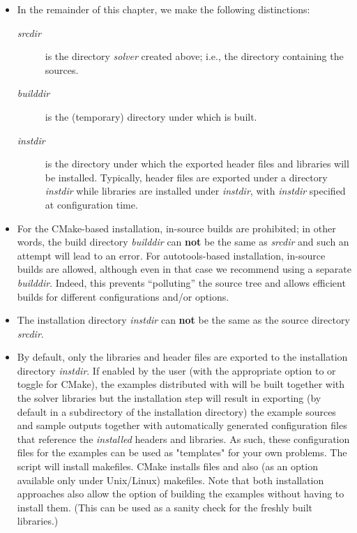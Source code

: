 \begin{itemize}

\item In the remainder of this chapter, we make the following distinctions:
  \begin{description}
  \item[{\em srcdir}] 
    is the directory {\em solver} created above; i.e., the 
    directory containing the {\sundials} sources.
  \item[{\em builddir}]
    is the (temporary) directory under which {\sundials} is built.
  \item[{\em instdir}]
    is the directory under which the {\sundials} exported header files
    and libraries will be installed. Typically, header files are exported under a directory
    {\em instdir} while libraries are installed under {\em instdir},
    with {\em instdir} specified at configuration time.
  \end{description}

\item For the CMake-based installation, in-source builds are prohibited; in other words, the
  build directory {\em builddir} can {\bf not} be the same as {\em srcdir}
  and such an attempt will lead to an error.  For autotools-based
  installation, in-source builds are allowed, although even in that
  case we recommend using a separate {\em builddir}. Indeed, this
  prevents ``polluting'' the source tree and allows efficient builds
  for different configurations and/or options.

\item {\warn} The installation directory {\em instdir} can {\bf not} be the same as
  the source directory {\em srcdir}.

\item By default, only the libraries and header files are exported to the installation
  directory {\em instdir}.  If enabled by the user (with the
  appropriate option to  or toggle for CMake), the
  examples distributed with {\sundials} will be built together with
  the solver libraries but the installation step will result in
  exporting (by default in a subdirectory of the installation
  directory) the example sources and sample outputs together with
  automatically generated configuration files that reference the {\em
  installed} {\sundials} headers and libraries.  As such, these
  configuration files for the {\sundials} examples can be used as
  "templates" for your own problems. The  script will
  install makefiles. CMake installs  files and also
  (as an option available only under Unix/Linux) makefiles. Note that
  both installation approaches also allow the option of building the
  {\sundials} examples without having to install them.  (This can be
  used as a sanity check for the freshly built libraries.)


\end{itemize}
